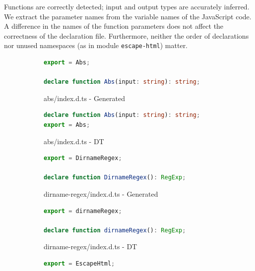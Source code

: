 \documentclass[english,cleveref,autoref,submission]{programming}
\begin{document}
Functions are correctly detected; input and output types are
accurately inferred. 
We extract the parameter names from the variable names of the JavaScript
code.
A difference in the names of the function parameters does not affect the correctness of
the declaration file.
Furthermore, neither the order of declarations nor unused namespaces
(as in module \texttt{escape-html}) matter.

 
\begin{figure}[tp]
    \centering
    \begin{subfigure}[t]{0.48\linewidth}
      \begin{lstlisting}[language=TypeScript,numbers=none]
export = Abs;

declare function Abs(input: string): string;
      \end{lstlisting}
      \caption{abs/index.d.ts - Generated}
    \end{subfigure}
    \hfill
    \begin{subfigure}[t]{0.48\linewidth}
      \begin{lstlisting}[language=TypeScript,numbers=none]
declare function Abs(input: string): string;
export = Abs;
      \end{lstlisting}
      \caption{abs/index.d.ts - DT}
    \end{subfigure}


    \begin{subfigure}[t]{0.48\linewidth}
        \begin{lstlisting}[language=TypeScript,numbers=none]
export = DirnameRegex;

declare function DirnameRegex(): RegExp;
        \end{lstlisting}
        \caption{dirname-regex/index.d.ts - Generated}
      \end{subfigure}
      \hfill
      \begin{subfigure}[t]{0.48\linewidth}
        \begin{lstlisting}[language=TypeScript,numbers=none]
export = dirnameRegex;

declare function dirnameRegex(): RegExp;
        \end{lstlisting}
        \caption{dirname-regex/index.d.ts - DT}
      \end{subfigure}


      \begin{subfigure}[t]{0.48\linewidth}
        \begin{lstlisting}[language=TypeScript,numbers=none]
export = EscapeHtml;


\end{lstlisting}
\end{subfigure}
\end{figure}
\end{document}

